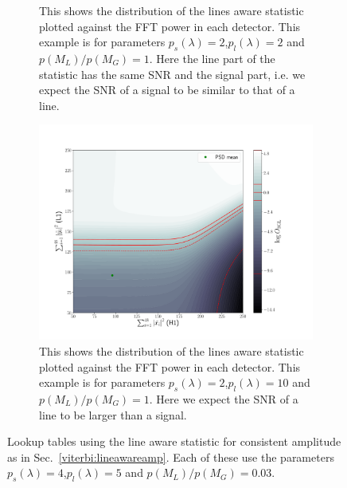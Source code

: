 \begin{figure}
\begin{subfigure}[h]{\linewidth}
\begin{minipage}{0.65\linewidth}
\end{minipage}\hfill
\begin{minipage}{0.35\linewidth}
\caption{This shows the distribution of the lines aware statistic plotted against the \ac{FFT} power in each detector. This example is for parameters $p_s(\lambda) = 2$,$p_l(\lambda) = 2$ and $p(M_L)/p(M_G) = 1$. Here the line part of the statistic has the same \ac{SNR} and the signal part, i.e. we expect the \ac{SNR} of a signal to be similar to that of a line.}
\label{viterbi:plot:data}
\end{minipage}
\end{subfigure}

\begin{subfigure}[h]{\linewidth}
\begin{minipage}{0.65\linewidth}
\includegraphics[width=0.9\columnwidth]{C3_soap/lookup_3d_0.pdf}
\end{minipage}\hfill
\begin{minipage}{0.35\linewidth}
\caption{This shows the distribution of the lines aware statistic plotted against the \ac{FFT} power in each detector. This example is for parameters $p_s(\lambda) = 2$,$p_l(\lambda) = 10$ and $p(M_L)/p(M_G) = 1$. Here we expect the \ac{SNR} of a line to be larger than a signal.}
\label{viterbi:plot:data}
\end{minipage}
\end{subfigure}
\caption{Lookup tables using the line aware statistic for consistent amplitude as in Sec.~\ref{viterbi:lineawareamp}. Each of these use the parameters $p_s(\lambda) = 4$,$p_l(\lambda) = 5$ and $p(M_L)/p(M_G) = 0.03$. }
\label{viterbi:lineawareamp:example}
\end{figure}

